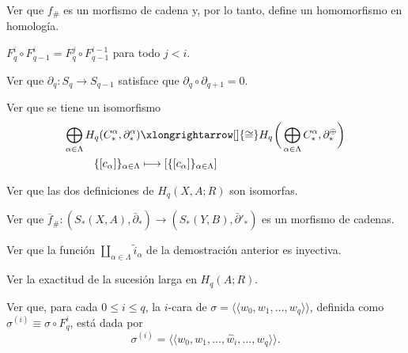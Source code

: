 \begin{ejercicio}
    Ver que $f_\#$ es un morfismo de cadena y, por lo tanto, define un homomorfismo en homología.
\end{ejercicio}

\begin{ejercicio}
     $F_q^i\circ F_{q-1}^i=F_q^j\circ F_{q-1}^{i-1}$ para todo $j<i$.
 \end{ejercicio}

\begin{ejercicio}
 Ver que $\partial_q:S_q\to S_{q-1}$ satisface que $\partial_q\circ \partial_{q+1}=0$.
 \end{ejercicio}

\begin{ejercicio}
Ver que se tiene un isomorfismo
\begin{align*}
    \bigoplus_{\alpha \in \Lambda} H_q(C_*^\alpha, \partial_*^\alpha)&\xlongrightarrow[]{\cong} H_q\hspace{0.2mm}\bigg(\displaystyle\bigoplus_{\alpha \in \Lambda} C_*^\alpha, \partial_*^\oplus\bigg)\\
    \{[c_\alpha]\}_{\alpha \in \Lambda}&\longmapsto [\{[c_\alpha]\}_{\alpha \in \Lambda}]
\end{align*}
\end{ejercicio}

\begin{ejercicio}
Ver que las dos definiciones de $H_q(X, A; R)$ son isomorfas.
\end{ejercicio}

\begin{ejercicio}
Ver que $\bar{f}_\# \colon (S_*(X, A), \bar{\partial}_*) \to (S_*(Y, B), \bar{\partial}'_*)$ es un morfismo de cadenas.
\end{ejercicio}

\begin{ejercicio}
Ver que la función $\coprod_{\alpha \in \Lambda} \tilde{i}_\alpha$ de la demostración anterior es inyectiva.
\end{ejercicio}

\begin{ejercicio}
Ver la exactitud de la sucesión larga en $H_q(A; R)$.
\end{ejercicio}

\begin{ejercicio}
Ver que, para cada $0 \leq i \leq q$, la $i$-cara de $\sigma = \langle\!\langle w_0, w_1, \dots, w_q \rangle\!\rangle$, definida como $\sigma^{(i)} \equiv \sigma \circ F_q^i$, está dada por
\[
\sigma^{(i)} = \langle\!\langle w_0, w_1, \dots, \hat{w}_i, \dots, w_q \rangle\!\rangle.
\]
\end{ejercicio}

